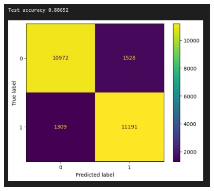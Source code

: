\documentclass{article}
\begin{document}
\begin{figure}[!h]
    \centering\includegraphics[scale=.70]{./test-LSTM-[16, 16]}
    \caption{}\label{fig.46}
\end{figure}







\end{document}
